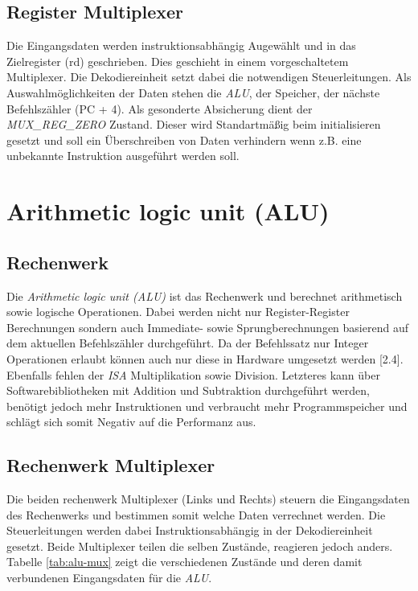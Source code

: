         \subsection{Register Multiplexer}
            Die Eingangsdaten werden instruktionsabhängig Augewählt und in das Zielregister (rd) geschrieben.
            Dies geschieht in einem vorgeschaltetem Multiplexer. Die Dekodiereinheit setzt dabei die notwendigen Steuerleitungen.
            Als Auswahlmöglichkeiten der Daten stehen die \textit{ALU}, der Speicher, der nächste Befehlszähler (PC + 4).
            Als gesonderte Absicherung dient der \textit{MUX\_REG\_ZERO} Zustand.
            Dieser wird Standartmäßig beim initialisieren gesetzt und soll ein Überschreiben von Daten verhindern wenn z.B.
            eine unbekannte Instruktion ausgeführt werden soll.
            

    \section{Arithmetic logic unit (ALU)}
        \subsection{Rechenwerk}
            Die \textit{Arithmetic logic unit (ALU)} ist das Rechenwerk und berechnet arith­me­tisch sowie logische Operationen.
            Dabei werden nicht nur Register-Register Berechnungen sondern auch Immediate- sowie Sprungberechnungen
            basierend auf dem aktuellen Befehlszähler durchgeführt.
            Da der Befehlssatz nur Integer Operationen erlaubt können auch nur diese in Hardware umgesetzt werden \cite{riscv-isa-specs}[2.4].
            Ebenfalls fehlen der \textit{ISA} Multiplikation sowie Division.
            Letzteres kann über Softwarebibliotheken mit Addition und Subtraktion durchgeführt werden,
            benötigt jedoch mehr Instruktionen und verbraucht mehr Programmspeicher und schlägt sich somit Negativ auf die Performanz aus.

        \subsection{Rechenwerk Multiplexer}
            Die beiden rechenwerk Multiplexer (Links und Rechts) steuern die Eingangsdaten des Rechenwerks und bestimmen somit welche Daten
            verrechnet werden. Die Steuerleitungen werden dabei Instruktionsabhängig in der Dekodiereinheit gesetzt.
            Beide Multiplexer teilen die selben Zustände, reagieren jedoch anders.
            Tabelle \ref{tab:alu-mux} zeigt die verschiedenen Zustände und deren damit verbundenen Eingangsdaten für die \textit{ALU}.


